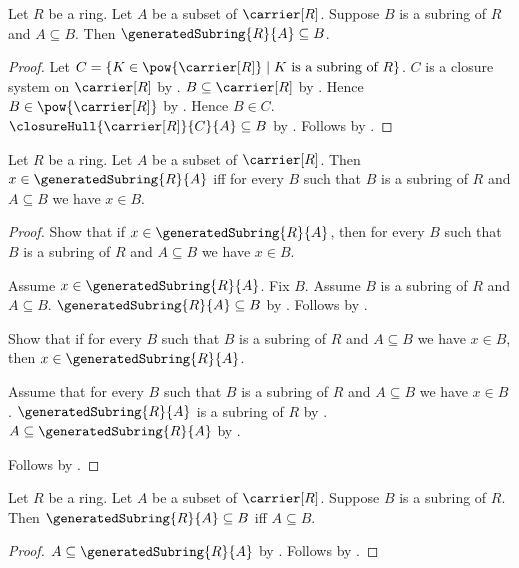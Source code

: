 \begin{theorem}\label{generated_subring_least}
    Let $R$ be a ring.
    Let $A$ be a subset of $\carrier[R]$.
    Suppose $B$ is a subring of $R$ and $A\subseteq B$.
    Then $\generatedSubring{R}{A}\subseteq B$.
\end{theorem}
\begin{proof}
    Let
        $C=\{K\in\pow{\carrier[R]}\mid
            \text{$K$ is a subring of $R$}\}$.
    $C$ is a closure system on $\carrier[R]$ by
        .
    $B\subseteq\carrier[R]$ by .
    Hence $B\in\pow{\carrier[R]}$ by .
    Hence $B\in C$.
    $\closureHull{\carrier[R]}{C}{A}\subseteq B$ by
        .
    Follows by .
\end{proof}

\begin{theorem}\label{generated_subring_iff}
    Let $R$ be a ring.
    Let $A$ be a subset of $\carrier[R]$.
    Then $x\in\generatedSubring{R}{A}$ iff for every $B$ such that
        $B$ is a subring of $R$ and $A\subseteq B$ we have $x\in B$.
\end{theorem}
\begin{proof}
    Show that if $x\in\generatedSubring{R}{A}$, then for every $B$ such that
        $B$ is a subring of $R$ and $A\subseteq B$ we have $x\in B$.
    \begin{subproof}
        Assume $x\in\generatedSubring{R}{A}$.
        Fix $B$.
        Assume $B$ is a subring of $R$ and $A\subseteq B$.
        $\generatedSubring{R}{A}\subseteq B$ by
            .
        Follows by .
    \end{subproof}
    Show that if for every $B$ such that
        $B$ is a subring of $R$ and $A\subseteq B$ we have $x\in B$, then
        $x\in\generatedSubring{R}{A}$.
    \begin{subproof}
        Assume that for every $B$ such that
            $B$ is a subring of $R$ and $A\subseteq B$ we have $x\in B$.
        $\generatedSubring{R}{A}$ is a subring of $R$ by
            .
        $A\subseteq\generatedSubring{R}{A}$ by
            .
    \end{subproof}
    Follows by \auto.
\end{proof}

\begin{theorem}\label{generated_subring_universal_property}
    Let $R$ be a ring.
    Let $A$ be a subset of $\carrier[R]$.
    Suppose $B$ is a subring of $R$.
    Then $\generatedSubring{R}{A}\subseteq B$ iff $A\subseteq B$.
\end{theorem}
\begin{proof}
    $A\subseteq\generatedSubring{R}{A}$ by
        .
    Follows by .
\end{proof}

